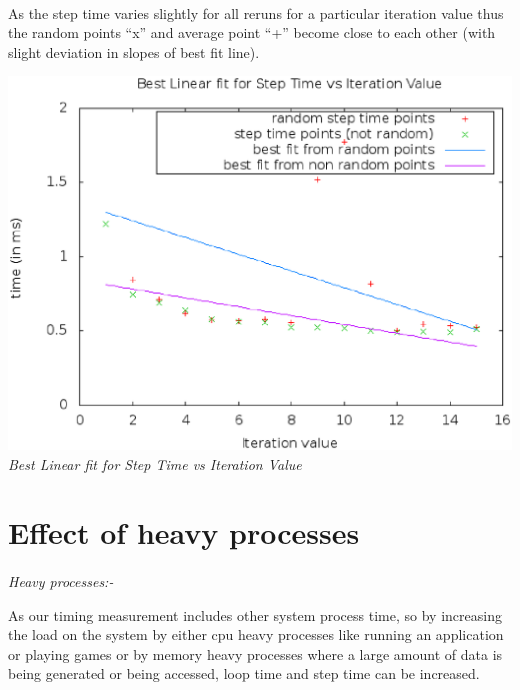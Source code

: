 \documentclass[11pt]{article}
\begin{document}
\paragraph{}
As the step time varies slightly for all reruns for a particular iteration value thus the random points “x” 
and average point “+” become close to each other (with slight deviation in slopes of best fit line).
\begin{center}
 \includegraphics[scale = 0.4]{images/plot5} \\
  \emph{Best Linear fit for Step Time vs Iteration Value} \\
\end{center}


\section{Effect of heavy processes}
\paragraph{}

\textit{Heavy processes:-}

As our timing measurement includes other system process time, so by increasing the load on the system by either
 cpu heavy processes like running an application or playing games or by memory heavy processes where a large amount of data
  is being generated or being accessed, loop time and step time can be increased.
\end{document}
